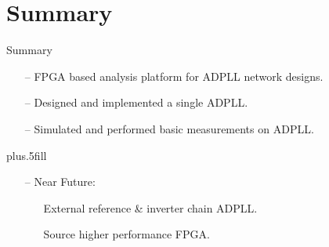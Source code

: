 \documentclass{beamer}
\begin{document}
\section*{Summary}

\begin{frame}{Summary}

    \begin{itemize}
        \item[--]
            FPGA based analysis platform for ADPLL network designs.
        \item[--]
            Designed and implemented a single ADPLL.
        \item[--]
            Simulated and performed basic measurements on ADPLL.
    \end{itemize}

    \vskip0pt plus.5fill
    \begin{itemize}
        \item[--]
        Near Future:
        \begin{itemize}
            \item[]
                External reference \& inverter chain ADPLL.
            \item[]
                Source higher performance FPGA.
    \end{itemize}
  \end{itemize}
\end{frame}
\end{document}
